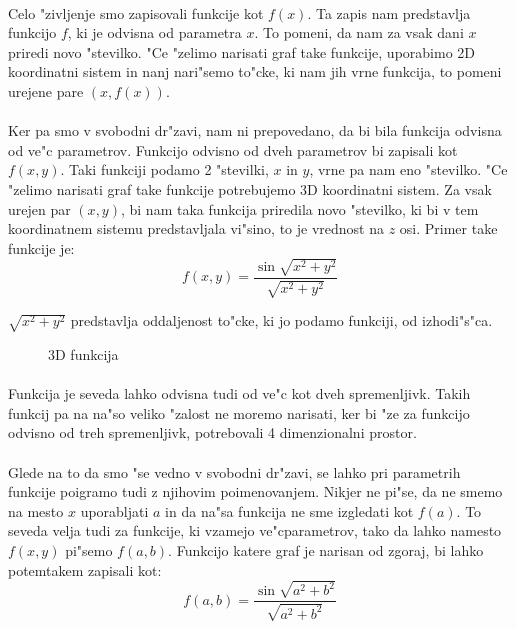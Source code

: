 \paragraph{}
Celo "zivljenje smo zapisovali funkcije kot $f(x)$. Ta zapis nam predstavlja funkcijo $f$, ki je odvisna od parametra $x$. To pomeni, da nam za vsak dani $x$ priredi novo "stevilko. "Ce "zelimo narisati graf take funkcije, uporabimo 2D koordinatni sistem in nanj nari"semo to"cke, ki nam jih vrne funkcija, to pomeni urejene pare $(x, f(x))$.

\paragraph{}
Ker pa smo v svobodni dr"zavi, nam ni prepovedano, da bi bila funkcija odvisna od ve"c parametrov. Funkcijo odvisno od dveh parametrov bi zapisali kot $f(x,y)$. Taki funkciji podamo 2 "stevilki, $x$ in $y$, vrne pa nam eno "stevilko. "Ce "zelimo narisati graf take funkcije potrebujemo 3D koordinatni sistem. Za vsak urejen par $(x,y)$, bi nam taka funkcija priredila novo "stevilko, ki bi v tem koordinatnem sistemu predstavljala vi"sino, to je vrednost na $z$ osi. Primer take funkcije je:
\[f(x,y) = \frac{\sin \sqrt{x^2 + y^2}}{\sqrt{x^2 + y^2}} \]

$\sqrt{x^2 + y^2}$ predstavlja oddaljenost to"cke, ki jo podamo funkciji, od izhodi"s"ca.

\begin{figure}[h!]
	\centering
	\caption{3D funkcija}
\end{figure}

\paragraph{}
Funkcija je seveda lahko odvisna tudi od ve"c kot dveh spremenljivk. Takih funkcij pa na na"so veliko "zalost ne moremo narisati, ker bi "ze za funkcijo odvisno od treh spremenljivk, potrebovali 4 dimenzionalni prostor.

\paragraph{}
Glede na to da smo "se vedno v svobodni dr"zavi, se lahko pri parametrih funkcije poigramo tudi z njihovim poimenovanjem. Nikjer ne pi"se, da ne smemo na mesto $x$ uporabljati $a$ in da na"sa funkcija ne sme izgledati kot $f(a)$. To seveda velja tudi za funkcije, ki vzamejo ve"cparametrov, tako da lahko namesto $f(x,y)$ pi"semo $f(a,b)$. Funkcijo katere graf je narisan od zgoraj, bi lahko potemtakem zapisali kot:
\[f(a,b) = \frac{\sin \sqrt{a^2 + b^2}}{\sqrt{a^2 + b^2}} \]

